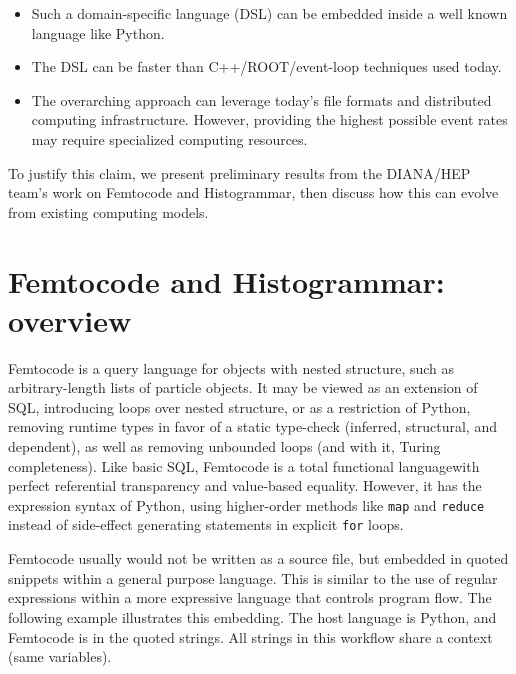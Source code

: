 \documentclass{article}
\begin{document}

\begin{itemize}
\item Such a domain-specific language (DSL) can be embedded inside a well known language like Python.
\item The DSL can be faster than C++/ROOT/event-loop techniques used today.
\item The overarching approach can leverage today's file formats and distributed computing infrastructure. However, providing the highest possible event rates may require specialized computing resources.
\end{itemize}

To justify this claim, we present preliminary results from the DIANA/HEP team's work on Femtocode and Histogrammar, then discuss how this can evolve from existing computing models.

\section{Femtocode and Histogrammar: overview}

Femtocode is a query language for objects with nested structure, such as arbitrary-length lists of particle objects. It may be viewed as an extension of SQL, introducing loops over nested structure, or as a restriction of Python, removing runtime types in favor of a static type-check (inferred, structural, and dependent), as well as removing unbounded loops (and with it, Turing completeness). Like basic SQL, Femtocode is a total functional language\footnotemark with perfect referential transparency and value-based equality. However, it has the expression syntax of Python, using higher-order methods like {\tt map} and {\tt reduce} instead of side-effect generating statements in explicit {\tt for} loops.


Femtocode usually would not be written as a source file, but embedded in quoted snippets within a general purpose language. This is similar to the use of regular expressions within a more expressive language that controls program flow. The following example illustrates this embedding. The host language is Python, and Femtocode is in the quoted strings. All strings in this workflow share a context (same variables).
\end{document}
